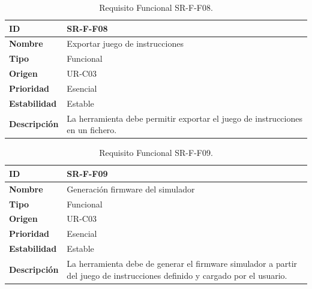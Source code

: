 \begin{center}
\begin{table}[htbp]
\centering
\begin{tabular}{@{}p{2.5cm} p{9cm}@{}} 
\toprule
\textbf{ID} 				& SR-F-F08 \\
\midrule
\textbf{Nombre} 			& Exportar juego de instrucciones\\
\midrule
\textbf{Tipo} 			& Funcional \\
\midrule
\textbf{Origen} 			& UR-C03 \\
\midrule
\textbf{Prioridad}		& Esencial \\
\midrule
\textbf{Estabilidad} 		& Estable \\
\midrule
\textbf{Descripción} 	& La herramienta debe permitir exportar el juego de instrucciones en un fichero. \\
\bottomrule
\end{tabular}
\caption{Requisito Funcional SR-F-F08.}
\label{tab:srff08}
\end{table}
\end{center}

\begin{center}
\begin{table}[htbp]
\centering
\begin{tabular}{@{}p{2.5cm} p{9cm}@{}} 
\toprule
\textbf{ID} 				& SR-F-F09 \\
\midrule
\textbf{Nombre} 			& Generación firmware del simulador\\
\midrule
\textbf{Tipo} 			& Funcional \\
\midrule
\textbf{Origen} 			& UR-C03 \\
\midrule
\textbf{Prioridad}		& Esencial \\
\midrule
\textbf{Estabilidad} 		& Estable \\
\midrule
\textbf{Descripción} 	& La herramienta debe de generar el firmware simulador a partir del juego de instrucciones definido y cargado por el usuario. \\
\bottomrule
\end{tabular}
\caption{Requisito Funcional SR-F-F09.}
\label{tab:srff09}
\end{table}
\end{center}

